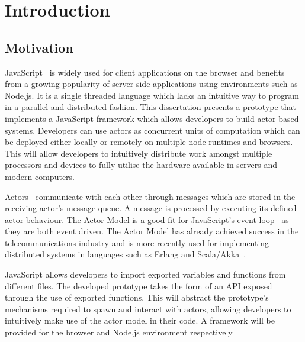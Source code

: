 \documentclass[12pt, a4paper]{report}
\theoremstyle{definition}
\theoremstyle{definition}%
\theoremstyle{definition}%
\theoremstyle{definition}%
\theoremstyle{definition}%
\theoremstyle{definition}%
\begin{document}
\tableofcontents

\listoffigures

\listoftables



\mainmatter

\chapter{Introduction}
\section{Motivation}
JavaScript~\cite{ecmascript} is widely used for client applications on the browser and benefits from a growing popularity of server-side applications using environments such as Node.js. It is a single threaded language which lacks an intuitive way to program in a parallel and distributed fashion. This dissertation presents a prototype that implements a JavaScript framework which allows developers to build actor-based systems. Developers can use actors as concurrent units of computation which can be deployed either locally or remotely on multiple node runtimes and browsers. This will allow developers to intuitively distribute work amongst multiple processors and devices to fully utilise the hardware available in servers and modern computers.

Actors~\cite{hewitt1973session}\cite{43years} communicate with each other through messages which are stored in the receiving actor's message queue. A message is processed by executing its defined actor behaviour. The Actor Model is a good fit for JavaScript's event loop~\cite{eventloopbrowser}\cite{eventloopnode} as they are both event driven. The Actor Model has already achieved success in the telecommunications industry and is more recently used for implementing distributed systems in languages such as Erlang and Scala/Akka~\cite{haller2012integration}.

JavaScript allows developers to import exported variables and functions from different files. The developed prototype takes the form of an API exposed through the use of exported functions. This will abstract the prototype's mechanisms required to spawn and interact with actors, allowing developers to intuitively make use of the actor model in their code. A framework will be provided for the browser and Node.js environment respectively
\end{document}
